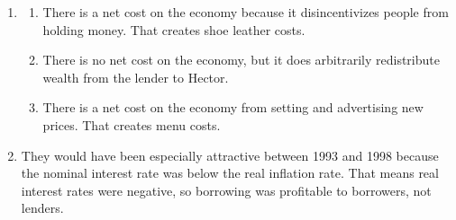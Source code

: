 \documentclass{article}
\begin{document}
\begin{enumerate}
\begin{enumerate}
	\item It hurts Lynn, and it helps Boris. If inflation is actually 7\%, then the real interest rate on the loan is actually $8\% - 7\% = 1\%$. That means Lynn receives less and Boris pays less than expected in terms of purchasing power.
	
	\end{enumerate}

\item

	\begin{enumerate}
	
	\item There is a net cost on the economy because it disincentivizes people from holding money. That creates shoe leather costs.
	
	\item There is no net cost on the economy, but it does arbitrarily redistribute wealth from the lender to Hector.
	
	\item There is a net cost on the economy from setting and advertising new prices. That creates menu costs. 
	
	\end{enumerate}
	
\item They would have been especially attractive between 1993 and 1998 because the nominal interest rate was below the real inflation rate. That means real interest rates were negative, so borrowing was profitable to borrowers, not lenders.

\end{enumerate}
\end{document}

